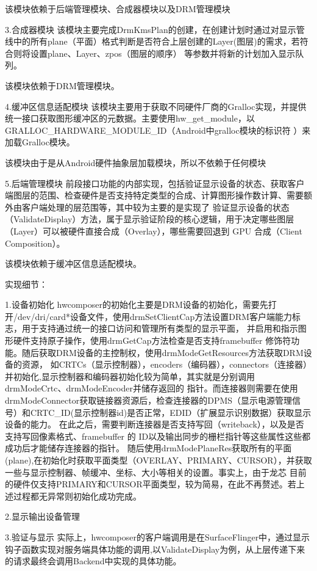 该模块依赖于后端管理模块、合成器模块以及DRM管理模块

3.合成器模块
该模块主要完成DrmKmsPlan的创建，在创建计划时通过对显示管线中的所有plane（平面）格式判断是否符合上层创建的Layer(图层)的需求，若符合则将设置plane、Layer、zpos（图层的顺序）
等参数并将新的计划加入显示队列。

该模块依赖于DRM管理模块。

4.缓冲区信息适配模块
该模块主要用于获取不同硬件厂商的Gralloc实现，并提供统一接口获取图形缓冲区的元数据。主要使用hw\_get\_module，以GRALLOC\_HARDWARE\_MODULE\_ID（Android中gralloc模块的标识符
）来加载Gralloc模块。

该模块由于是从Android硬件抽象层加载模块，所以不依赖于任何模块

5.后端管理模块
前段接口功能的内部实现，包括验证显示设备的状态、获取客户端图层的范围、检查硬件是否支持特定类型的合成、计算图形操作数计算、需要额外由客户端处理的层范围等，其中较为主要的是实现了
验证显示设备的状态（ValidateDisplay）方法，属于显示验证阶段的核心逻辑，用于决定哪些图层（Layer）可以被硬件直接合成（Overlay），哪些需要回退到 GPU 合成（Client Composition）。

该模块依赖于缓冲区信息适配模块。

实现细节：

1.设备初始化
hwcomposer的初始化主要是DRM设备的初始化，需要先打开/dev/dri/card*设备文件，使用drmSetClientCap方法设置DRM客户端能力标志，用于支持通过统一的接口访问和管理所有类型的显示平面，
并启用和指示图形硬件支持原子操作，使用drmGetCap方法检查是否支持framebuffer 修饰符功能。随后获取DRM设备的主控制权，使用drmModeGetResources方法获取DRM设备的资源，
如CRTCs（显示控制器），encoders（编码器），connectors（连接器）并初始化,显示控制器和编码器初始化较为简单，其实就是分别调用drmModeCrtc、drmModeEncoder并储存返回的
指针。而连接器则需要在使用drmModeConnector获取链接器资源后，检查连接器的DPMS（显示电源管理信号）和CRTC\_ID(显示控制器id)是否正常，EDID（扩展显示识别数据）获取显示设备的能力。
在此之后，需要判断连接器是否支持写回（writeback），以及是否支持写回像素格式、framebuffer 的 ID以及输出同步的栅栏指针等这些属性这些都成功后才能储存连接器的指针。
随后使用drmModePlaneRes获取所有的平面(plane),在初始化时获取平面类型（OVERLAY、PRIMARY、CURSOR），并获取一些与显示控制器、帧缓冲、坐标、大小等相关的设置。事实上，由于龙芯
目前的硬件仅支持PRIMARY和CURSOR平面类型，较为简易，在此不再赘述。若上述过程都无异常则初始化成功完成。

2.显示输出设备管理

3.验证与显示
实际上，hwcomposer的客户端调用是在SurfaceFlinger中，通过显示钩子函数实现对服务端具体功能的调用,以ValidateDisplay为例，从上层传递下来的请求最终会调用Backend中实现的具体功能。


